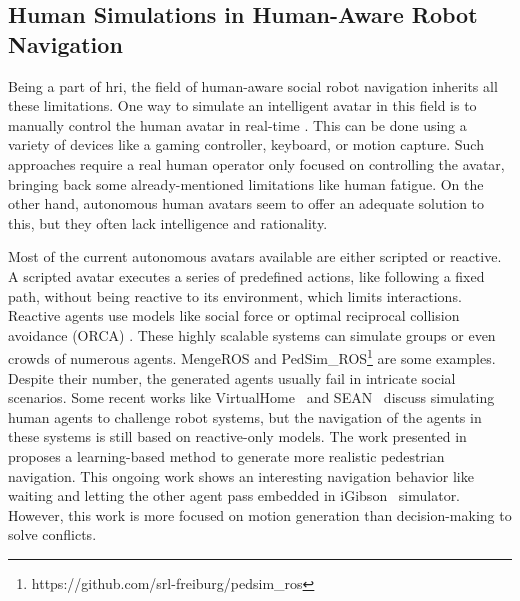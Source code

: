 \subsection{Human Simulations in Human-Aware Robot Navigation}

Being a part of \acrshort{hri}, the field of human-aware social robot navigation inherits all these limitations. One way to simulate an intelligent avatar in this field is to manually control the human avatar in real-time \cite{echeverria_simulating_2012}. 
This can be done using a variety of devices like a gaming controller, keyboard, or motion capture. Such approaches require a real human operator only focused on controlling the avatar, bringing back some already-mentioned limitations like human fatigue. On the other hand, autonomous human avatars seem to offer an adequate solution to this, but they often lack intelligence and rationality. 

Most of the current autonomous avatars available are either scripted or reactive. A scripted avatar executes a series of predefined actions, like following a fixed path, without being reactive to its environment, which limits interactions. Reactive agents use models like social force \cite{helbing1995social} or optimal reciprocal collision avoidance (ORCA) \cite{van2011reciprocal}. These highly scalable systems can simulate groups or even crowds of numerous agents. MengeROS \cite{aroor_mengeros_2018} and PedSim\_ROS\footnote{https://github.com/srl-freiburg/pedsim\_ros} are some examples. Despite their number, the generated agents usually fail in intricate social scenarios. Some recent works like VirtualHome~\cite{puig_virtualhome_2018} and SEAN~\cite{Tsoi_2020_HAI,tsoi2022sean} discuss simulating human agents to challenge robot systems, but the navigation of the agents in these systems is still based on reactive-only models. 
The work presented in~\cite{social_igibson} proposes a learning-based method to generate more realistic pedestrian navigation. This ongoing work shows an interesting navigation behavior like waiting and letting the other agent pass embedded in iGibson~\cite{shenigibson} simulator. However, this work is more focused on motion generation than decision-making to solve conflicts. 

